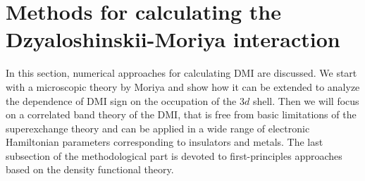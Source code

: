 \documentclass[aps,prl,twocolumn,showpacs,amsmath,amssymb]{revtex4-1}
\begin{document}
\section{Methods for calculating the Dzyaloshinskii-Moriya interaction}
In this section, numerical approaches for calculating DMI are discussed.
We start with a microscopic theory by Moriya \cite{moriya} and show how it can be extended to analyze the dependence of DMI sign on the occupation of the $3d$ shell.  Then we will focus on a correlated band theory of the DMI, that is free from basic limitations of the superexchange theory and can be applied in a wide range of electronic Hamiltonian parameters corresponding to insulators and metals.
The last subsection of the methodological part is devoted to first-principles approaches based on the density functional theory.
\end{document}
